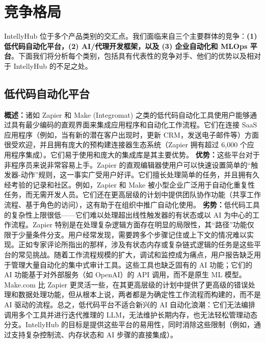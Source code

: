 \documentclass[11点, A4纸, 单面]{article}
\begin{document}
\section{竞争格局}

IntellyHub 位于多个产品类别的交汇点。我们面临来自三个主要群体的竞争：\textbf{(1) 低代码自动化平台，(2) AI/代理开发框架，以及 (3) 企业自动化和 MLOps 平台}。下面我们将分析每个类别，包括具有代表性的竞争对手、他们的优势以及相对于 IntellyHub 的不足之处。

\subsection{低代码自动化平台}

\textbf{概述：}诸如 Zapier 和 Make (Integromat) 之类的低代码自动化工具使用户能够通过具有最少编码的直观界面来集成应用程序和自动化工作流程。它们在连接 SaaS 应用程序（例如，当有新的潜在客户出现时，更新 CRM，发送电子邮件等）方面很受欢迎，并且拥有庞大的预构建连接器生态系统（Zapier 拥有超过 6,000 个应用程序集成\cite{zapierApps}）。它们易于使用和庞大的集成库是其主要优势。
\newline\newline
\textbf{优势：}这些平台对于非程序员来说非常容易上手。Zapier 的直观编辑器使用户可以快速设置简单的“触发器-动作”规则，这一事实广受用户好评\cite{g2ZapierReviews}。它们擅长处理简单的任务，并且拥有久经考验的记录和社区。例如，Zapier 和 Make 被小型企业广泛用于自动化重复性任务，而无需开发人员。它们还在更高层级的计划中提供团队协作功能（共享工作流程、基于角色的访问），这有助于在组织中推广自动化使用\cite{zapierPricing}。
\newline\newline
\textbf{劣势：}低代码工具的复杂性上限很低——它们难以处理超出线性触发器的有状态或以 AI 为中心的工作流程。Zapier 特别是在处理复杂逻辑方面存在明显的局限性，其“路径”功能仅限于少量条件分支。用户经常发现，需要跨多个步骤记住或上下文的情况难以实现。正如专家评论所指出的那样，涉及有状态内存或复杂链式逻辑的任务是这些平台的常见挑战。随着工作流程规模的扩大，调试和监控成为痛点，用户报告缺乏用于管理大量自动化的集中式审计工具\cite{g2ZapierReviews}。这些工具也缺乏固有的 AI 功能；它们的 AI 功能基于对外部服务（如 OpenAI）的 API 调用，而不是原生 ML 模型\cite{zapierOpenAI}。Make.com 比 Zapier 更灵活一些，在其更高层级的计划中提供了更高级的错误处理和数据处理功能\cite{g2MakeVsZapier}，但从根本上说，两者都是为确定性工作流程而构建的，而不是 AI 驱动的流程。总之，低代码平台不适合新兴的 AI 自动化浪潮：它们无法编排调用多个工具并进行迭代推理的 LLM，无法维护长期内存，也无法轻松管理动态分支。IntellyHub 的目标是提供这些平台的易用性，同时消除这些限制（例如，通过支持复杂控制流、内存状态和 AI 步骤的直接集成）。
\end{document}
